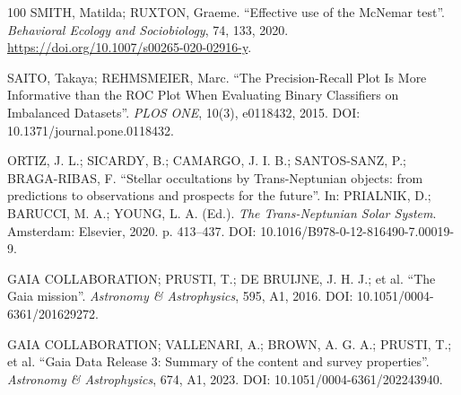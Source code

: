 \documentclass[msc]{on} %
\begin{document}
\begin{thebibliography}{100}
SMITH, Matilda; RUXTON, Graeme. ``Effective use of the McNemar test''. \emph{Behavioral Ecology and Sociobiology}, 74, 133, 2020. \url{https://doi.org/10.1007/s00265-020-02916-y}.
%



 SAITO, Takaya; REHMSMEIER, Marc. ``The Precision-Recall Plot Is More Informative than the ROC Plot When Evaluating Binary Classifiers on Imbalanced Datasets''. \emph{PLOS ONE}, 10(3), e0118432, 2015. DOI: 10.1371/journal.pone.0118432.

 ORTIZ, J. L.; SICARDY, B.; CAMARGO, J. I. B.; SANTOS-SANZ, P.; BRAGA-RIBAS, F. ``Stellar occultations by Trans-Neptunian objects: from predictions to observations and prospects for the future''. In: PRIALNIK, D.; BARUCCI, M. A.; YOUNG, L. A. (Ed.). \emph{The Trans-Neptunian Solar System}. Amsterdam: Elsevier, 2020. p. 413--437. DOI: 10.1016/B978-0-12-816490-7.00019-9.

 GAIA COLLABORATION; PRUSTI, T.; DE BRUIJNE, J. H. J.; et al. ``The Gaia mission''. \emph{Astronomy \& Astrophysics}, 595, A1, 2016. DOI: 10.1051/0004-6361/201629272.

 GAIA COLLABORATION; VALLENARI, A.; BROWN, A. G. A.; PRUSTI, T.; et al. ``Gaia Data Release 3: Summary of the content and survey properties''. \emph{Astronomy \& Astrophysics}, 674, A1, 2023. DOI: 10.1051/0004-6361/202243940.


\end{thebibliography}
\end{document}
